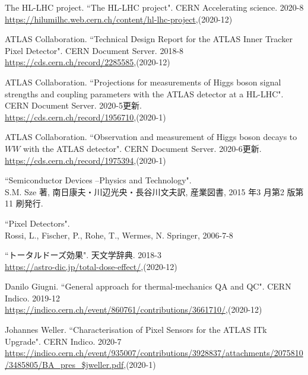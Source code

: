 \begin{thebibliography}{9}
The HL-LHC project. ``The HL-LHC project". CERN Accelerating science. 2020-8\\
\url{https://hilumilhc.web.cern.ch/content/hl-lhc-project},(2020-12)

ATLAS Collaboration. ``Technical Design Report for the ATLAS Inner Tracker Pixel Detector". CERN Document Server. 2018-8\\
\url{https://cds.cern.ch/record/2285585},(2020-12)


ATLAS Collaboration. ``Projections for measurements of Higgs boson signal strengths and coupling parameters with the ATLAS detector at a HL-LHC". CERN Document Server. 2020-5更新.\\
\url{https://cds.cern.ch/record/1956710},(2020-1)

ATLAS Collaboration. ``Observation and measurement of Higgs boson decays to $WW$ with the ATLAS detector". CERN Document Server. 2020-6更新.\\
\url{https://cds.cern.ch/record/1975394},(2020-1)

``Semiconductor Devices –Physics and Technology".\\
S.M. Sze 著, 南日康夫・川辺光央・長谷川文夫訳, 産業図書, 2015 年3 月第2 版第11 刷発行.

``Pixel Detectors". \\
Rossi, L., Fischer, P., Rohe, T., Wermes, N. Springer, 2006-7-8

``トータルドーズ効果". 天文学辞典. 2018-3\\
\url{https://astro-dic.jp/total-dose-effect/},(2020-12)

Danilo Giugni. ``General approach for thermal-mechanics QA and QC". CERN Indico. 2019-12\\
\url{https://indico.cern.ch/event/860761/contributions/3661710/},(2020-12)

Johannes Weller. ``Characterisation of Pixel Sensors for the ATLAS ITk Upgrade". CERN Indico. 2020-7\\
\url{https://indico.cern.ch/event/935007/contributions/3928837/attachments/2075810/3485805/BA_pres_$jweller.pdf},(2020-1)


\end{thebibliography}
